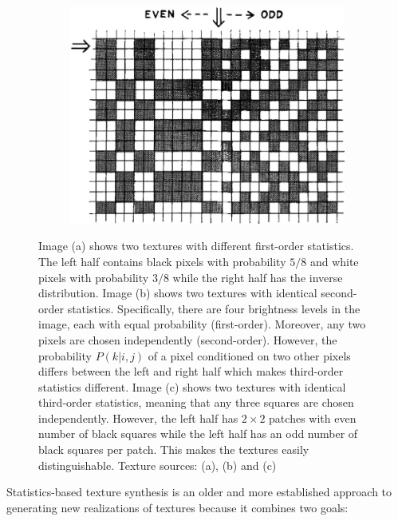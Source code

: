 \begin{figure}[t]
\begin{subfigure}[b]{0.29\textwidth}
        \caption{}
    \end{subfigure}
    \hfill
    \begin{subfigure}[b]{0.39\textwidth}
        \centering
        \includegraphics[width=\textwidth]{images/02-julesz-3rd_order.jpg}
        \caption{}
    \end{subfigure}
    \caption{Image (a) shows two textures with different first-order statistics. The left half contains black pixels with probability \(5/8\) and white pixels with probability \(3/8\) while the right half has the inverse distribution. Image (b) shows two textures with identical second-order statistics. Specifically, there are four brightness levels in the image, each with equal probability (first-order). Moreover, any two pixels are chosen independently (second-order). However, the probability \(P(k | i,j)\) of a pixel conditioned on two other pixels differs between the left and right half which makes third-order statistics different. Image (c) shows two textures with identical third-order statistics, meaning that any three squares are chosen independently. However, the left half has \(2 \times 2\) patches with even number of black squares while the left half has an odd number of black squares per patch. This makes the textures easily distinguishable. Texture sources: \citet{Julesz1962} (a), (b) and \citet{Julesz1973} (c)}
    \label{fig:background_julesz_textures}
\end{figure}

Statistics-based texture synthesis is an older and more established approach to generating new realizations of textures because it combines two goals:

